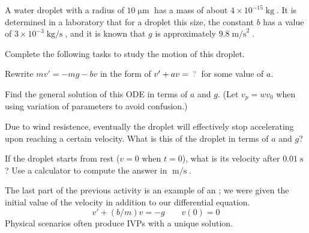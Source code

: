 \begin{applicationActivities}
\begin{activity}{20}
A water droplet with a radius of \(10\operatorname{\mu m}\) has a mass of about \(4 \times 10^{-15}\operatorname{kg}\).  
It is determined in a laboratory that for a droplet this size, the constant \(b\) has a value of \(3\times 10^{-3}\operatorname{kg/s}\),
and it is known that \(g\) is approximately \(9.8\operatorname{m/s}^2\).

\vfill

Complete the following tasks to study the motion of this droplet.
\begin{subactivity}
Rewrite \(mv'=-mg-bv\) in the form of \(v'+av=\unknown\) for some value of \(a\).
\end{subactivity}
\begin{subactivity}
Find the general solution of this ODE in terms of \(a\) and \(g\). 
(Let \(v_p=wv_0\) when using variation of parameters to avoid confusion.)
\end{subactivity}
\begin{subactivity}
Due to wind resistence, eventually the droplet will effectively stop accelerating upon reaching a certain velocity.
What is this  of the droplet in terms of \(a\) and \(g\)?
\end{subactivity}
\begin{subactivity}
If the droplet starts from rest (\(v=0\) when \(t=0\)), what is its velocity after \(0.01\operatorname{s}\)?
Use a calculator to compute the answer in \(\operatorname{m/s}\).
\end{subactivity}
\end{activity}


\begin{definition}
The last part of the previous activity is an example of an ; we were given the initial value of the velocity in addition to our differential equation.
\vfill
\[
  v'+(b/m)v=-g \hspace{2em} v(0)=0
\]
\vfill
Physical scenarios often produce IVPs with a unique solution.
\end{definition}


\end{applicationActivities}

